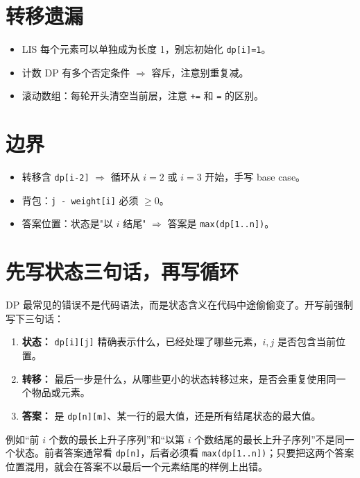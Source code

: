 \documentclass[UTF8,openany,oneside,zihao=-4]{ctexbook}
\begin{document}
\section{转移遗漏}

\begin{itemize}
  \item LIS 每个元素可以单独成为长度 1，别忘初始化 \lstinline|dp[i]=1|。
  \item 计数 DP 有多个否定条件 $\Rightarrow$ 容斥，注意别重复减。
  \item 滚动数组：每轮开头清空当前层，注意 \lstinline|+=| 和 \lstinline|=| 的区别。
\end{itemize}

\section{边界}

\begin{itemize}
  \item 转移含 \lstinline|dp[i-2]| $\Rightarrow$ 循环从 $i=2$ 或 $i=3$ 开始，手写 base case。
  \item 背包：\lstinline|j - weight[i]| 必须 $\ge 0$。
  \item 答案位置：状态是"以 $i$ 结尾" $\Rightarrow$ 答案是 \lstinline|max(dp[1..n])|。
\end{itemize}

\section{先写状态三句话，再写循环}

DP 最常见的错误不是代码语法，而是状态含义在代码中途偷偷变了。开写前强制写下三句话：

\begin{enumerate}
  \item \textbf{状态：} \lstinline|dp[i][j]| 精确表示什么，已经处理了哪些元素，$i,j$ 是否包含当前位置。
  \item \textbf{转移：} 最后一步是什么，从哪些更小的状态转移过来，是否会重复使用同一个物品或元素。
  \item \textbf{答案：} 是 \lstinline|dp[n][m]|、某一行的最大值，还是所有结尾状态的最大值。
\end{enumerate}

例如“前 $i$ 个数的最长上升子序列”和“以第 $i$ 个数结尾的最长上升子序列”不是同一个状态。前者答案通常看 \lstinline|dp[n]|，后者必须看 \lstinline|max(dp[1..n])|；只要把这两个答案位置混用，就会在答案不以最后一个元素结尾的样例上出错。
\end{document}
